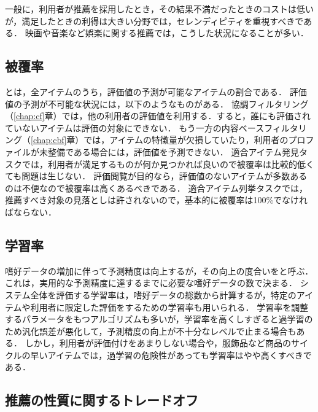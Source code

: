一般に，利用者が推薦を採用したとき，その結果不満だったときのコストは低いが，満足したときの利得は大きい分野では，セレンディピティを重視すべきである．
映画や音楽など娯楽に関する推薦では，こうした状況になることが多い．

\subsection{被覆率}

とは，全アイテムのうち，評価値の予測が可能なアイテムの割合である．
評価値の予測が不可能な状況には，以下のようなものがある．
協調フィルタリング（\ref{chap:cf}章）では，他の利用者の評価値を利用する．すると，誰にも評価されていないアイテムは評価の対象にできない．
もう一方の内容ベースフィルタリング（\ref{chap:cbf}章）では，アイテムの特徴量が欠損していたり，利用者のプロファイルが未整備である場合には，評価値を予測できない．
適合アイテム発見タスクでは，利用者が満足するものが何か見つかれば良いので被覆率は比較的低くても問題は生じない．
評価閲覧が目的なら，評価値のないアイテムが多数あるのは不便なので被覆率は高くあるべきである．
適合アイテム列挙タスクでは，推薦すべき対象の見落としは許されないので，基本的に被覆率は100\%でなければならない．

\subsection{学習率}

嗜好データの増加に伴って予測精度は向上するが，その向上の度合いをと呼ぶ．これは，実用的な予測精度に達するまでに必要な嗜好データの数で決まる．
システム全体を評価する学習率は，嗜好データの総数から計算するが，特定のアイテムや利用者に限定した評価をするための学習率も用いられる．
学習率を調整するパラメータをもつアルゴリズムも多いが，学習率を高くしすぎると過学習のため汎化誤差が悪化して，予測精度の向上が不十分なレベルで止まる場合もある．
しかし，利用者が評価付けをあまりしない場合や，服飾品など商品のサイクルの早いアイテムでは，過学習の危険性があっても学習率はやや高くすべきである．

\subsection{推薦の性質に関するトレードオフ}


